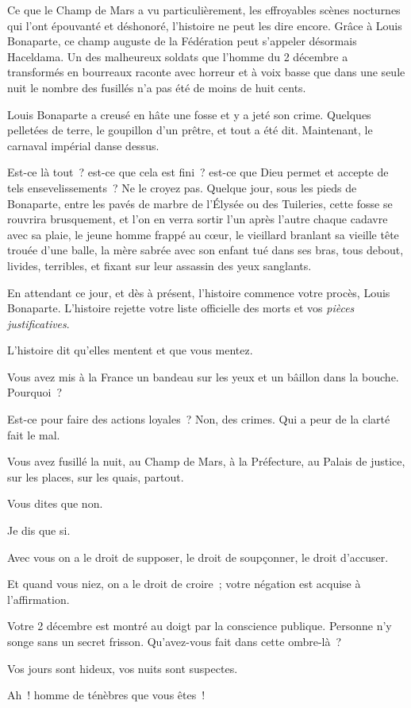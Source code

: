\documentclass[french,twoside]{book} %
\begin{document}
Ce que le Champ de Mars a vu particulièrement, les effroyables scènes nocturnes qui l’ont épouvanté et déshonoré, l’histoire ne peut les dire encore. Grâce à Louis Bonaparte, ce champ auguste de la Fédération peut s’appeler désormais Haceldama. Un des malheureux soldats que l’homme du 2 décembre a transformés en bourreaux raconte avec horreur et à voix basse que dans une seule nuit le nombre des fusillés n’a pas été de moins de huit cents.\par
Louis Bonaparte a creusé en hâte une fosse et y a jeté son crime. Quelques pelletées de terre, le goupillon d’un prêtre, et tout a été dit. Maintenant, le carnaval impérial danse dessus.\par
Est-ce là tout ? est-ce que cela est fini ? est-ce que Dieu permet et accepte de tels ensevelissements ? Ne le croyez pas. Quelque jour, sous les pieds de Bonaparte, entre les pavés de marbre de l’Élysée ou des Tuileries, cette fosse se rouvrira brusquement, et l’on en verra sortir l’un après l’autre chaque cadavre avec sa plaie, le jeune homme frappé au cœur, le vieillard branlant sa vieille tête trouée d’une balle, la mère sabrée avec son enfant tué dans ses bras, tous debout, livides, terribles, et fixant sur leur assassin des yeux sanglants.\par
En attendant ce jour, et dès à présent, l’histoire commence votre procès, Louis Bonaparte. L’histoire rejette votre liste officielle des morts et vos \emph{pièces justificatives}.\par
L’histoire dit qu’elles mentent et que vous mentez.\par
Vous avez mis à la France un bandeau sur les yeux et un bâillon dans la bouche. Pourquoi ?\par
Est-ce pour faire des actions loyales ? Non, des crimes. Qui a peur de la clarté fait le mal.\par
Vous avez fusillé la nuit, au Champ de Mars, à la Préfecture, au Palais de justice, sur les places, sur les quais, partout.\par
Vous dites que non.\par
Je dis que si.\par
Avec vous on a le droit de supposer, le droit de soupçonner, le droit d’accuser.\par
Et quand vous niez, on a le droit de croire ; votre négation est acquise à l’affirmation.\par
Votre 2 décembre est montré au doigt par la conscience publique. Personne n’y songe sans un secret frisson. Qu’avez-vous fait dans cette ombre-là ?\par
Vos jours sont hideux, vos nuits sont suspectes.\par
Ah ! homme de ténèbres que vous êtes !\par
\end{document}
